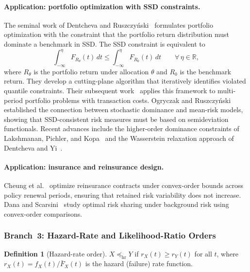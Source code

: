 \documentclass[11pt,a4paper]{article}
\theoremstyle{plain}
\theoremstyle{definition}
\newtheorem{definition}[theorem]{Definition}
\theoremstyle{remark}
\begin{document}
\paragraph{Application: portfolio optimization with SSD constraints.}
The seminal work of Dentcheva and Ruszczy\'{n}ski~\cite{dentcheva2003}
formulates portfolio optimization with the constraint that the portfolio
return distribution must dominate a benchmark in SSD.  The SSD constraint
is equivalent to
\begin{equation}\label{eq:ssd_integral}
  \int_{-\infty}^{\eta} F_{R_\theta}(t)\,dt
  \le \int_{-\infty}^{\eta} F_{R_0}(t)\,dt
  \qquad \forall\, \eta \in \mathbb{R},
\end{equation}
where $R_\theta$ is the portfolio return under allocation $\theta$ and
$R_0$ is the benchmark return.  They develop a cutting-plane algorithm
that iteratively identifies violated quantile constraints.  Their
subsequent work~\cite{dentcheva2006} applies this framework to
multi-period portfolio problems with transaction costs.  Ogryczak and
Ruszczy\'{n}ski~\cite{ogryczak1999} established the connection between
stochastic dominance and mean-risk models, showing that SSD-consistent
risk measures must be based on semideviation functionals.
Recent advances include the higher-order dominance constraints of
Lakshmanan, Pichler, and Kopa~\cite{lakshmanan2025} and the
Wasserstein relaxation approach of Dentcheva and
Yi~\cite{dentchevayi2025}.

\paragraph{Application: insurance and reinsurance design.}
Cheung et al.~\cite{cheung2014} optimize reinsurance contracts under
convex-order bounds across policy renewal periods, ensuring that
retained risk variability does not increase.  Dana and
Scarsini~\cite{dana2007} study optimal risk sharing under background
risk using convex-order comparisons.

\subsubsection{Branch~3: Hazard-Rate and Likelihood-Ratio Orders}
\label{sec:macro:hr}

\begin{definition}[Hazard-rate order]
\label{def:hr}
$X \preceq_{\mathrm{hr}} Y$ if $r_X(t) \ge r_Y(t)$ for all $t$,
where $r_X(t) = f_X(t)/\bar{F}_X(t)$ is the hazard (failure) rate
function.
\end{definition}
\end{document}
